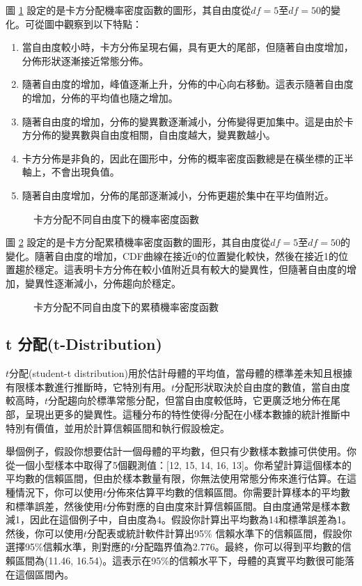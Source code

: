 \documentclass[12pt, a4paper]{article}
\begin{document}
圖 \ref{fig:chi-squared-pdf} 設定的是卡方分配機率密度函數的圖形，其自由度從$df=5$至$df=50$的變化。可從圖中觀察到以下特點：
\begin{enumerate}
\item 當自由度較小時，卡方分佈呈現右偏，具有更大的尾部，但隨著自由度增加，分佈形狀逐漸接近常態分佈。
\item 隨著自由度的增加，峰值逐漸上升，分佈的中心向右移動。這表示隨著自由度的增加，分佈的平均值也隨之增加。
\item 隨著自由度的增加，分佈的變異數逐漸減小，分佈變得更加集中。這是由於卡方分佈的變異數與自由度相關，自由度越大，變異數越小。
\item 卡方分佈是非負的，因此在圖形中，分佈的概率密度函數總是在橫坐標的正半軸上，不會出現負值。
\item 隨著自由度增加，分佈的尾部逐漸減小，分佈更趨於集中在平均值附近。
\end{enumerate}
\begin{figure}[h]
    \caption{卡方分配不同自由度下的機率密度函數}
    \label{fig:chi-squared-pdf}
\end{figure}
圖 \ref{fig:chi-squared-cdf} 設定的是卡方分配累積機率密度函數的圖形，其自由度從$df=5$至$df=50$的變化。隨著自由度的增加，CDF曲線在接近0的位置變化較快，然後在接近1的位置趨於穩定。這表明卡方分佈在較小值附近具有較大的變異性，但隨著自由度的增加，變異性逐漸減小，分佈趨向於穩定。
\begin{figure}[h]
    \caption{卡方分配不同自由度下的累積機率密度函數}
    \label{fig:chi-squared-cdf}
\end{figure}
\subsection{t 分配(t-Distribution)}
$t$分配(student-t distribution)用於估計母體的平均值，當母體的標準差未知且根據有限樣本數進行推斷時，它特別有用。$t$分配形狀取決於自由度的數值，當自由度較高時，$t$分配趨向於標準常態分配，但當自由度較低時，它更廣泛地分佈在尾部，呈現出更多的變異性。這種分布的特性使得$t$分配在小樣本數據的統計推斷中特別有價值，並用於計算信賴區間和執行假設檢定。

舉個例子，假設你想要估計一個母體的平均數，但只有少數樣本數據可供使用。你從一個小型樣本中取得了5個觀測值：[12, 15, 14, 16, 13]。你希望計算這個樣本的平均數的信賴區間，但由於樣本數量有限，你無法使用常態分佈來進行估算。在這種情況下，你可以使用$t$分佈來估算平均數的信賴區間。你需要計算樣本的平均數和標準誤差，然後使用$t$分佈對應的自由度來計算信賴區間。自由度通常是樣本數減1，因此在這個例子中，自由度為4。假設你計算出平均數為14和標準誤差為1。然後，你可以使用$t$分配表或統計軟件計算出95\% 信賴水準下的信賴區間，假設你選擇95\%信賴水準，則對應的$t$分配臨界值為2.776。最終，你可以得到平均數的信賴區間為(11.46, 16.54)。這表示在95\%的信賴水平下，母體的真實平均數很可能落在這個區間內。
\end{document}
